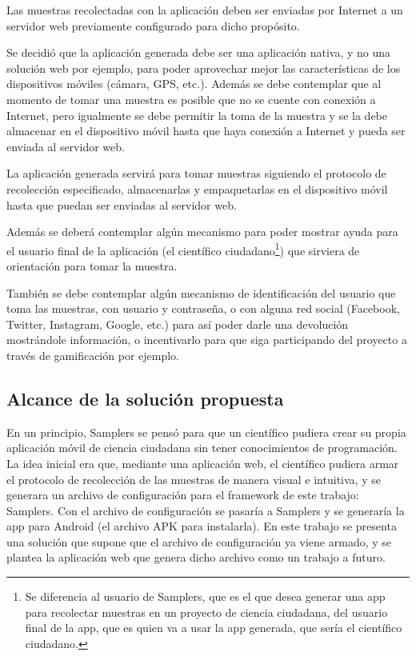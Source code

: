 Las muestras recolectadas con la aplicación deben ser enviadas por Internet a un servidor web previamente configurado para dicho propósito.

Se decidió que la aplicación generada debe ser una aplicación nativa, y no una solución web por ejemplo, para poder aprovechar mejor las características de los dispositivos móviles (cámara, GPS, etc.). Además se debe contemplar que al momento de tomar una muestra es posible que no se cuente con conexión a Internet, pero igualmente se debe permitir la toma de la muestra y se la debe almacenar en el dispositivo móvil hasta que haya conexión a Internet y pueda ser enviada al servidor web.

La aplicación generada servirá para tomar muestras siguiendo el protocolo de recolección especificado, almacenarlas y empaquetarlas en el dispositivo móvil hasta que puedan ser enviadas al servidor web.

Además se deberá contemplar algún mecanismo para poder mostrar ayuda para el usuario final de la aplicación (el científico ciudadano\footnote{Se diferencia al usuario de Samplers, que es el que desea generar una app para recolectar muestras en un proyecto de ciencia ciudadana, del usuario final de la app, que es quien va a usar la app generada, que sería el científico ciudadano.}) que sirviera de orientación para tomar la muestra. 

También se debe contemplar algún mecanismo de identificación del usuario que toma las muestras, con usuario y contraseña, o con alguna red social (Facebook, Twitter, Instagram, Google, etc.) para así poder darle una devolución mostrándole información, o incentivarlo para que siga participando del proyecto a través de gamificación por ejemplo.

\clearpage

\subsection{Alcance de la solución propuesta}
En un principio, Samplers se pensó para que un científico pudiera crear su propia aplicación móvil de ciencia ciudadana sin tener conocimientos de programación. 
La idea inicial era que, mediante una aplicación web, el científico pudiera armar el protocolo de recolección de las muestras de manera visual e intuitiva, y se generara un archivo de configuración para el framework de este trabajo: Samplers. 
Con el archivo de configuración se pasaría a Samplers y se generaría la app para Android (el archivo APK para instalarla). 
En este trabajo se presenta una solución que supone que el archivo de configuración ya viene armado, y se plantea la aplicación web que genera dicho archivo como un trabajo a futuro.

